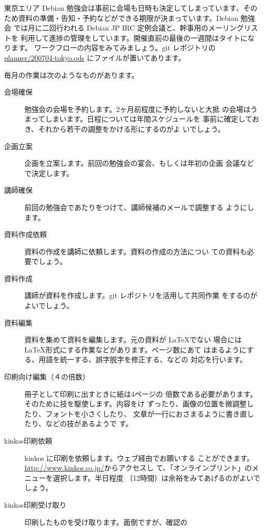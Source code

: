 \documentclass[mingoth,a4paper]{jsarticle}
\begin{document}
\label{sec:debmtg2007workflow}


東京エリア Debian 勉強会は事前に会場も日時も決定してしまっています、その
ため資料の準備・告知・予約などができる期限が決まっています。Debian 勉強会
では月に二回行われる Debian JP IRC 定例会議と、幹事用のメーリングリストを
利用して進捗の管理をしています。開催直前の最後の一週間はタイトになります。
ワークフローの内容をみてみましょう。git レポジトリの
\url{planner/200704-tokyo.ods} にファイルが置いてあります。

毎月の作業は次のようなものがあります。
\begin{description}
\item[会場確保]  勉強会の会場を予約します。2ヶ月前程度に予約しないと大抵
	   の会場はうまってしまいます。日程については年間スケジュールを
	   事前に確定しておき、それから若干の調整をかける形にするのがよ
	   いでしょう。
\item[企画立案] 企画を立案します。前回の勉強会の宴会、もしくは年初の企画
	   会議などで決定します。
\item[講師確保] 前回の勉強会であたりをつけて、講師候補のメールで調整する
	   ようにします。
\item[資料作成依頼] 資料の作成を講師に依頼します。資料の作成の方法につい
	   ての資料も必要でしょう。
\item[資料作成] 講師が資料を作成します。git レポジトリを活用して共同作業
	   をするのがよいでしょう。
\item[資料編集] 資料を集めて資料を編集します。元の資料が \LaTeX{}でない
	   場合には\LaTeX{}形式にする作業などがあります。ページ数にあて
	   はまるようにする、用語を統一する、誤字脱字を修正する、などの
	   対応を行います。
\item[印刷向け編集（４の倍数）] 冊子として印刷に出すときに紙は4ページの
	   倍数である必要があります。そのために技を駆使します。内容をけ
	   ずったり、画像の位置を微調整したり、フォントを小さくしたり、
	   文章が一行におさまるように書き直したり、などの技があるようで
	   す。
\item[kinkos印刷依頼] kinkos に印刷を依頼します。ウェブ経由でお願いする
	   ことができます。\url{http://www.kinkos.co.jp/}からアクセスし
	   て、「オンラインプリント」のメニューを選択します。半日程度
	   （12時間）は余裕をみてあげるのがよいでしょう。
\item[kinkos印刷受け取り] 印刷したものを受け取ります。面倒ですが、確認の

\end{description}
\end{document}

